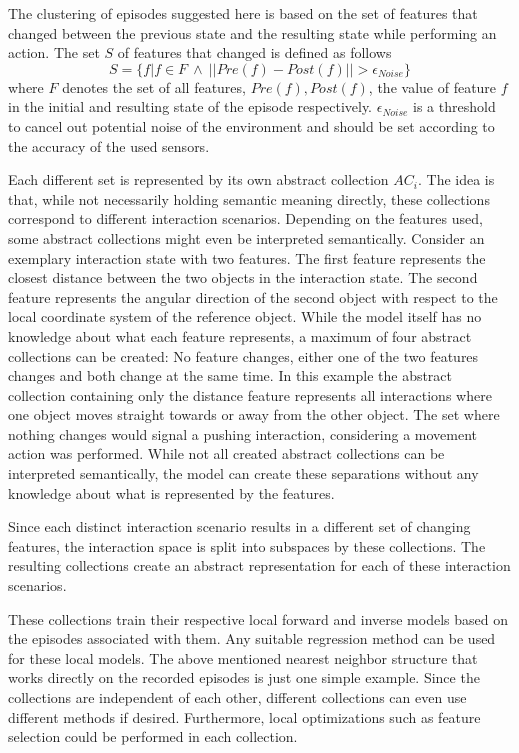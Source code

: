 The clustering of episodes suggested here is based on the set of features that changed between the previous state and the resulting state while performing an action. The set $S$ of features that changed is defined as follows 
\begin{equation}
S = \{f | f \in F ~ \wedge ~ ||Pre(f)-Post(f)|| > \epsilon_{Noise}\}
\label{eq:difSet}
\end{equation}
where $F$ denotes the set of all features, $Pre(f), Post(f)$, the value of 
feature $f$ in the initial and resulting state of the episode respectively. $\epsilon_{Noise}$ is a threshold to cancel out potential noise of the environment and should be set according to the accuracy of the used sensors.

Each different set is represented by its own abstract collection $AC_i$. The 
idea is that, while not necessarily holding semantic meaning directly, these collections correspond to different interaction scenarios. Depending on the features used, some abstract collections might even be interpreted semantically.
Consider an exemplary interaction state with two features. The first feature represents the closest distance between the two objects in the interaction state. The second feature represents the angular direction of the second object with respect to the local coordinate system of the reference object. While the model itself has no knowledge about what each feature represents, a maximum of four abstract collections can be created: No feature changes, either one of the two features changes and both change at the same time. In this example the abstract collection containing only the distance feature represents all interactions where one object moves straight towards or away from the other object. The set where nothing changes would signal a pushing interaction, considering a movement action was performed. While not all created abstract collections can be interpreted semantically, the model can create these separations without any knowledge about what is represented by the features.

Since each distinct interaction scenario results in a different set of changing features, the interaction space is split into subspaces by these collections. The resulting collections create an abstract representation for each of these interaction scenarios. 

These collections train their respective local forward and inverse models based on the episodes associated with them. Any suitable regression method can be used for these local models. The above mentioned nearest neighbor structure that works directly on the recorded episodes is just one simple example. Since the collections are independent of each other, different collections can even use different methods if desired. Furthermore, local optimizations such as feature selection could be performed in each collection. %

